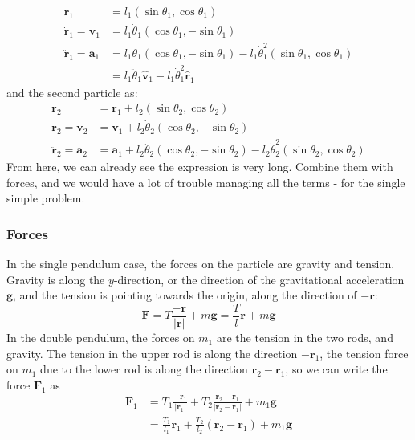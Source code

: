 \begin{align}
    \mathbf{r}_1 &= l_1 (\sin \theta_1, \cos \theta_1) \\
    \dot{\mathbf{r}}_1 = \mathbf{v}_1 &= l_1 \dot{\theta}_1 (\cos \theta_1, -\sin \theta_1) \\
    \ddot{\mathbf{r}}_1 = \mathbf{a}_1 &= l_1 \ddot{\theta}_1 (\cos \theta_1, -\sin \theta_1) 
        - l_1 \dot{\theta}_1^2 (\sin \theta_1, \cos \theta_1) \\
        &= l_1 \ddot{\theta}_1 \hat{\mathbf{v}}_1 - l_1 \dot{\theta}_1^2 \hat{\mathbf{r}}_1
\end{align}
and the second particle as:
\begin{align}
    \mathbf{r}_2 &= \mathbf{r}_1 + l_2 (\sin \theta_2, \cos \theta_2) \\
    \dot{\mathbf{r}}_2 = \mathbf{v}_2 &= \mathbf{v}_1 + l_2 \dot{\theta}_2 (\cos \theta_2, -\sin \theta_2) \\
    \ddot{\mathbf{r}}_2 = \mathbf{a}_2 &= \mathbf{a}_1 + l_2 \ddot{\theta}_2 (\cos \theta_2, -\sin \theta_2) 
        - l_2 \dot{\theta}_2^2 (\sin \theta_2, \cos \theta_2)
\end{align}
From here, we can already see the expression is very long. Combine them with forces, and we would have a lot of trouble managing all the terms - for the single simple problem. 

\subsubsection{Forces}
In the single pendulum case, the forces on the particle are gravity and tension. Gravity is along the $y$-direction, or the direction of the gravitational acceleration $\mathbf{g}$, and the tension is pointing towards the origin, along the direction of $-\mathbf{r}$: 
\begin{equation}
  \mathbf{F} = T \frac{-\mathbf{r}}{\lvert \mathbf{r}\rvert} + m \mathbf{g} = \frac{T}{l} \mathbf{r} + m \mathbf{g}
\end{equation}
In the double pendulum, the forces on $m_{1}$ are the tension in the two rods, and gravity. The tension in the upper rod is along the direction $-\mathbf{r}_{1}$, the tension force on $m_{1}$ due to the lower rod is along the direction $\mathbf{r}_{2}-\mathbf{r}_{1}$, so we can write the force $\mathbf{F}_{1}$ as
\begin{equation}
  \begin{split}
    \mathbf{F}_{1} &= T_{1} \frac{-\mathbf{r}_{1}}{\lvert \mathbf{r}_{1}\rvert} + T_{2} \frac{\mathbf{r}_{2}-\mathbf{r}_{1}}{\lvert \mathbf{r}_{2}-\mathbf{r}_{1}\rvert} + m_{1}\mathbf{g} \\
    & = \frac{T_{1}}{l_{1}} \mathbf{r}_{1} + \frac{T_{2}}{l_{2}} (\mathbf{r}_{2}-\mathbf{r}_{1}) + m_{1}\mathbf{g}
  \end{split}
\end{equation}

